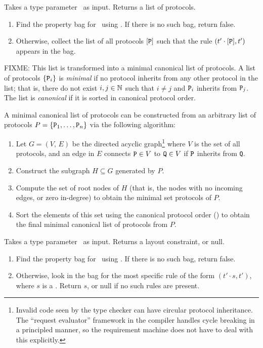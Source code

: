 \documentclass[../generics]{subfiles}
\begin{document}
\begin{algorithm}\label{alg:get required protocols}
Takes a type parameter \tT\ as input. Returns a list of protocols.
\begin{enumerate}
\item Find the property bag for \tT\ using . If there is no such bag, return false.
\item Otherwise, collect the list of all protocols $[\texttt{P}]$ such that the rule $(t' \cdot [\texttt{P}], t')$ appears in the bag.
\end{enumerate}

FIXME: This list is transformed into a minimal canonical list of protocols.
A list of protocols $\{\texttt{P}_i\}$ is \emph{minimal} if
no
protocol inherits from any other protocol in the list; that is, there do not exist $i,
j\in\mathbb{N}$ such that $i\neq j$ and $\texttt{P}_i$ inherits from $\texttt{P}_j$. The list is
\emph{canonical}
if it is sorted in canonical protocol order.

A minimal canonical list of protocols
can be constructed from an arbitrary list of protocols
$P=\{\texttt{P}_1,\ldots,\texttt{P}_n\}$ via the following algorithm:
\begin{enumerate}
\item Let $G=(V,\, E)$ be the directed acyclic graph\footnote{Invalid code seen by the
type checker can have circular protocol inheritance. The ``request evaluator''
framework in the compiler handles cycle breaking in a principled manner, so the
requirement machine does not have to deal with this explicitly.} where $V$ is the set
of all protocols, and an edge in $E$ connects $\texttt{P}\in V$ to $\texttt{Q} \in V$ if
$\texttt{P}$ inherits from \texttt{Q}.
\item Construct the subgraph $H\subseteq G$ generated by $P$.
\item Compute the set of root nodes of $H$ (that is, the nodes with no incoming edges, or zero in-degree) to obtain the minimal set protocols of
$P$.
\item Sort the elements of this set using the canonical protocol order () to obtain the
final minimal canonical list of protocols from $P$.
\end{enumerate}
\end{algorithm}

\begin{algorithm}\label{alg:get layout constraint}
Takes a type parameter \tT\ as input. Returns a layout constraint, or null.
\begin{enumerate}
\item Find the property bag for \tT\ using . If there is no such bag, return false.
\item Otherwise, look in the bag for the most specific rule of the form $(t' \cdot s, t')$, where $s$ is a . Return $s$, or null if no such rules are present.
\end{enumerate}
\end{algorithm}
\end{document}

